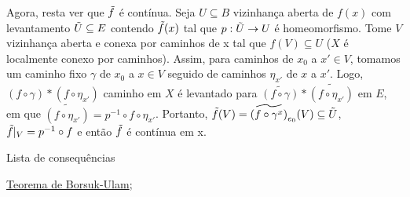 \begin{dem}
    Agora, resta ver que $\Tilde{f}$ é contínua. Seja $U \subseteq B$ vizinhança aberta de $f(x)$ com levantamento $\Tilde{U} \subseteq E$ contendo $\Tilde{f}(x)$ tal que $p: \Tilde{U} \rightarrow U$ é homeomorfismo. Tome $V$ vizinhança aberta e conexa por caminhos de x tal que $f(V) \subseteq U$ ($X$ é localmente conexo por caminhos). Assim, para caminhos de $x_0$ a $x' \in V$, tomamos um caminho fixo $\gamma$ de $x_0$ a $x \in V$ seguido de caminhos $\eta_{x'}$ de $x$ a $x'$. Logo, $(f \circ \gamma) \ast (f \circ \eta_{x'})$ caminho em $X$ é levantado para $\widetilde{(f \circ \gamma)} \ast \widetilde{(f \circ \eta_{x'})}$ em $E$, em que $\widetilde{(f \circ \eta_{x'})} = p^{-1} \circ f \circ  \eta_{x'}$. Portanto, $\Tilde{f}(V) = \widetilde{(f \circ \gamma^{x})}_{e_0} (V) \subseteq \Tilde{U}$, $\Tilde{f}|_V = p^{-1} \circ f$ e então $\Tilde{f}$ é contínua em x.
     
\end{dem}
\begin{titlemize}{Lista de consequências}
	\item \hyperref[teorema-borsuk-ulam]{Teorema de Borsuk-Ulam};\\ %
\end{titlemize}

